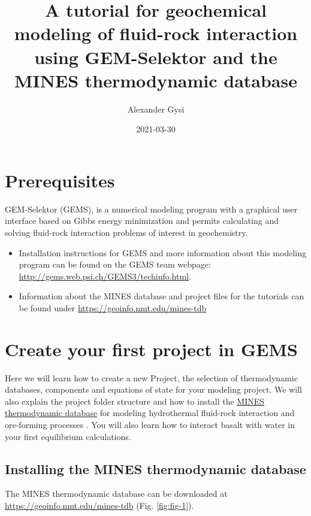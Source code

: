 \documentclass[
]{book}
\title{A tutorial for geochemical modeling of fluid-rock interaction using GEM-Selektor and the MINES thermodynamic database}
\author{Alexander Gysi}
\date{2021-03-30}
\begin{document}
\maketitle

{
\setcounter{tocdepth}{1}
\tableofcontents
}
\hypertarget{prerequisites}{%
\chapter*{Prerequisites}\label{prerequisites}}

GEM-Selektor (GEMS), is a numerical modeling program with a graphical user interface based on Gibbs energy minimization and permits calculating and solving fluid-rock interaction problems of interest in geochemistry.

\begin{itemize}
\item
  Installation instructions for GEMS and more information about this modeling program can be found on the GEMS team webpage: \url{http://gems.web.psi.ch/GEMS3/techinfo.html}.
\item
  Information about the MINES database and project files for the tutorials can be found under \url{https://geoinfo.nmt.edu/mines-tdb}
\end{itemize}

\hypertarget{intro}{%
\chapter{Create your first project in GEMS}\label{intro}}

Here we will learn how to create a new Project, the selection of thermodynamic databases, components and equations of state for your modeling project. We will also explain the project folder structure and how to install the \href{https://geoinfo.nmt.edu/mines-tdb}{MINES thermodynamic database} for modeling hydrothermal fluid-rock interaction and ore-forming processes . You will also learn how to interact basalt with water in your first equilibrium calculations.

\hypertarget{installing-the-mines-thermodynamic-database}{%
\section{Installing the MINES thermodynamic database}\label{installing-the-mines-thermodynamic-database}}

The MINES thermodynamic database can be downloaded at \url{https://geoinfo.nmt.edu/mines-tdb} (Fig. \ref{fig:fig-1}).
\end{document}
